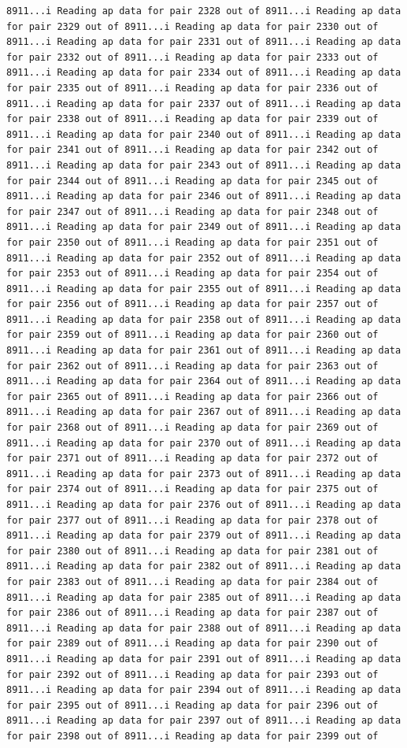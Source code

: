 \documentclass[
]{article}
\begin{document}
\begin{verbatim}
8911...i Reading ap data for pair 2328 out of 8911...i Reading ap data for pair 2329 out of 8911...i Reading ap data for pair 2330 out of 8911...i Reading ap data for pair 2331 out of 8911...i Reading ap data for pair 2332 out of 8911...i Reading ap data for pair 2333 out of 8911...i Reading ap data for pair 2334 out of 8911...i Reading ap data for pair 2335 out of 8911...i Reading ap data for pair 2336 out of 8911...i Reading ap data for pair 2337 out of 8911...i Reading ap data for pair 2338 out of 8911...i Reading ap data for pair 2339 out of 8911...i Reading ap data for pair 2340 out of 8911...i Reading ap data for pair 2341 out of 8911...i Reading ap data for pair 2342 out of 8911...i Reading ap data for pair 2343 out of 8911...i Reading ap data for pair 2344 out of 8911...i Reading ap data for pair 2345 out of 8911...i Reading ap data for pair 2346 out of 8911...i Reading ap data for pair 2347 out of 8911...i Reading ap data for pair 2348 out of 8911...i Reading ap data for pair 2349 out of 8911...i Reading ap data for pair 2350 out of 8911...i Reading ap data for pair 2351 out of 8911...i Reading ap data for pair 2352 out of 8911...i Reading ap data for pair 2353 out of 8911...i Reading ap data for pair 2354 out of 8911...i Reading ap data for pair 2355 out of 8911...i Reading ap data for pair 2356 out of 8911...i Reading ap data for pair 2357 out of 8911...i Reading ap data for pair 2358 out of 8911...i Reading ap data for pair 2359 out of 8911...i Reading ap data for pair 2360 out of 8911...i Reading ap data for pair 2361 out of 8911...i Reading ap data for pair 2362 out of 8911...i Reading ap data for pair 2363 out of 8911...i Reading ap data for pair 2364 out of 8911...i Reading ap data for pair 2365 out of 8911...i Reading ap data for pair 2366 out of 8911...i Reading ap data for pair 2367 out of 8911...i Reading ap data for pair 2368 out of 8911...i Reading ap data for pair 2369 out of 8911...i Reading ap data for pair 2370 out of 8911...i Reading ap data for pair 2371 out of 8911...i Reading ap data for pair 2372 out of 8911...i Reading ap data for pair 2373 out of 8911...i Reading ap data for pair 2374 out of 8911...i Reading ap data for pair 2375 out of 8911...i Reading ap data for pair 2376 out of 8911...i Reading ap data for pair 2377 out of 8911...i Reading ap data for pair 2378 out of 8911...i Reading ap data for pair 2379 out of 8911...i Reading ap data for pair 2380 out of 8911...i Reading ap data for pair 2381 out of 8911...i Reading ap data for pair 2382 out of 8911...i Reading ap data for pair 2383 out of 8911...i Reading ap data for pair 2384 out of 8911...i Reading ap data for pair 2385 out of 8911...i Reading ap data for pair 2386 out of 8911...i Reading ap data for pair 2387 out of 8911...i Reading ap data for pair 2388 out of 8911...i Reading ap data for pair 2389 out of 8911...i Reading ap data for pair 2390 out of 8911...i Reading ap data for pair 2391 out of 8911...i Reading ap data for pair 2392 out of 8911...i Reading ap data for pair 2393 out of 8911...i Reading ap data for pair 2394 out of 8911...i Reading ap data for pair 2395 out of 8911...i Reading ap data for pair 2396 out of 8911...i Reading ap data for pair 2397 out of 8911...i Reading ap data for pair 2398 out of 8911...i Reading ap data for pair 2399 out of 
\end{verbatim}
\end{document}
